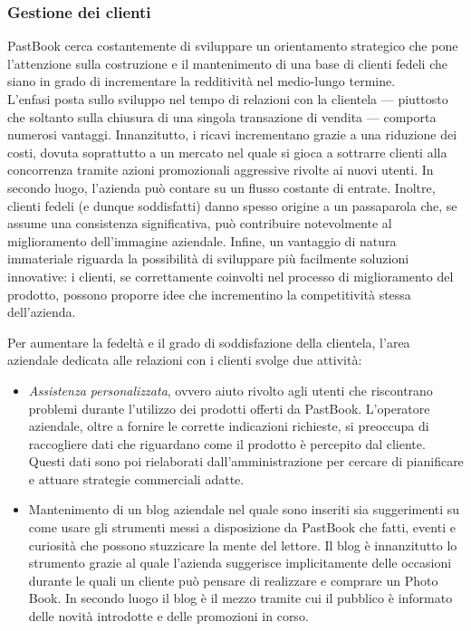 			\subsubsection{Gestione dei clienti}
				PastBook cerca costantemente di sviluppare un orientamento strategico che pone l'attenzione sulla costruzione e il
				mantenimento di una base di clienti fedeli che siano in grado di incrementare la redditività nel medio-lungo
				termine.\\
				L'enfasi posta sullo sviluppo nel tempo di relazioni con la clientela — piuttosto che soltanto sulla chiusura di una
				singola transazione di vendita — comporta numerosi vantaggi. Innanzitutto, i ricavi incrementano grazie a una
				riduzione dei costi, dovuta soprattutto a un mercato nel quale si gioca a sottrarre clienti alla concorrenza tramite
				azioni promozionali aggressive rivolte ai nuovi utenti. In secondo luogo, l'azienda può contare su un flusso costante
				di entrate. Inoltre, clienti fedeli (e dunque soddisfatti) danno spesso origine a un passaparola che, se assume una
				consistenza significativa, può contribuire notevolmente al miglioramento dell'immagine aziendale. Infine, un
				vantaggio di natura immateriale riguarda la possibilità di sviluppare più facilmente soluzioni innovative: i clienti,
				se correttamente coinvolti nel processo di miglioramento del prodotto, possono proporre idee che incrementino la
				competitività stessa dell'azienda.
				
				Per aumentare la fedeltà e il grado di soddisfazione della clientela, l'area aziendale dedicata alle relazioni con
				i clienti svolge due attività:
				\begin{itemize}
					\item \emph{Assistenza personalizzata}, ovvero aiuto rivolto agli utenti che riscontrano problemi durante
					l'utilizzo dei prodotti offerti da PastBook. L'operatore aziendale, oltre a fornire le corrette	indicazioni
					richieste, si preoccupa di raccogliere dati che riguardano come il prodotto è percepito dal cliente. Questi
					dati sono poi rielaborati dall'amministrazione per cercare di pianificare e attuare strategie commerciali
					adatte.
					\item {Mantenimento di un blog} aziendale nel quale sono inseriti sia suggerimenti su come usare gli
					strumenti messi a disposizione da PastBook che fatti, eventi e curiosità che possono stuzzicare la mente del
					lettore. Il blog è innanzitutto lo strumento grazie al quale l'azienda suggerisce implicitamente delle
					occasioni durante le quali un cliente può pensare di realizzare e comprare un Photo Book. In secondo luogo il
					blog è il mezzo tramite cui il pubblico è informato delle novità introdotte e delle promozioni in corso.
				\end{itemize}
